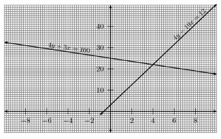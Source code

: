 {\begin{mdframed}[linewidth=4, leftmargin=40, rightmargin=40]
\begin{exercise}
\begin{enumerate}[noitemsep, label=\textbf{Step} \textbf{\arabic*}. ]
	\begin{figure}[H] %
    \begin{center}
    \label{m39257*id159679!!!underscore!!!media}\label{m39257*id159679!!!underscore!!!printimage}\includegraphics{col11306.imgs/m39257_MG10C10_007.png} %
        
      \vspace{2pt}
    \vspace{.1in}
    
    \end{center}

 \end{figure}   

    \addtocounter{footnote}{-0}
    

\end{enumerate}
\end{exercise}
\end{mdframed}}
